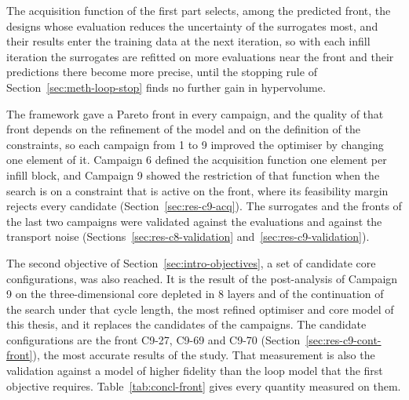  The acquisition
function of the first part selects, among the predicted front, the
designs whose evaluation reduces the uncertainty of the surrogates
most, and their results enter the training data at the next iteration,
so with each infill iteration the surrogates are refitted on more
evaluations near the front and their predictions there become more
precise, until the stopping rule of Section~\ref{sec:meth-loop-stop}
finds no further gain in hypervolume.

The framework gave a Pareto front in every campaign, and the quality
of that front depends on the refinement of the model and on the
definition of the constraints, so each campaign from 1 to 9 improved
the optimiser by changing one element of it. Campaign 6 defined the
acquisition function one element per infill block, and Campaign 9
showed the restriction of that function when the search is on a
constraint that is active on the front, where its feasibility margin
rejects every candidate (Section~\ref{sec:res-c9-acq}). The surrogates
and the fronts of the last two campaigns were validated against the
evaluations and against the transport noise
(Sections~\ref{sec:res-c8-validation}
and~\ref{sec:res-c9-validation}).

The second objective of Section~\ref{sec:intro-objectives}, a set of
candidate core configurations, was also reached. It is the result of
the post-analysis of Campaign 9 on the three-dimensional core depleted
in 8 layers and of the continuation of the search under that cycle
length, the most refined optimiser and core model of this thesis, and
it replaces the candidates of the campaigns. The candidate
configurations are the front C9-27, C9-69 and C9-70
(Section~\ref{sec:res-c9-cont-front}), the most accurate results of
the study. That measurement is also the validation
against a model of higher fidelity than the loop model that the first
objective requires. Table~\ref{tab:concl-front} gives every
quantity measured on them.

